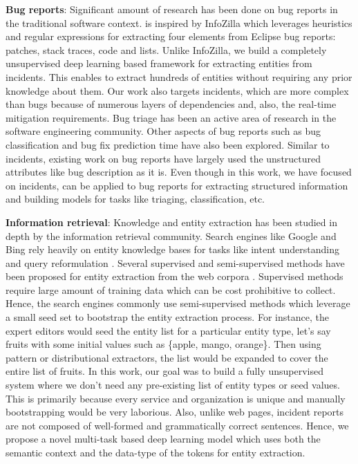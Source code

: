 \textbf{Bug reports}: Significant amount of research has been done on bug reports in the traditional software context. \softner{} is inspired by InfoZilla \cite{bettenburg2008extracting} which leverages heuristics and regular expressions for extracting four elements from Eclipse bug reports: patches, stack traces, code and lists. Unlike InfoZilla, we build a completely unsupervised deep learning based framework for extracting entities from incidents. This enables \softner{} to extract hundreds of entities without requiring any prior knowledge about them. Our work also targets incidents, which are more complex than bugs because of numerous layers of dependencies and, also, the real-time mitigation requirements. Bug triage has been an active area of research \cite{anvik2006should, tian2016learning, bortis2013porchlight, wang2014fixercache} in the software engineering community. Other aspects of bug reports such as bug classification \cite{zhou2016combining} and bug fix prediction time \cite{ardimento2017knowledge} have also been explored. Similar to incidents, existing work on bug reports have largely used the unstructured attributes like bug description as it is. Even though in this work, we have focused on incidents, \softner{} can be applied to bug reports for extracting structured information and building models for tasks like triaging, classification, etc.

\textbf{Information retrieval}: Knowledge and entity extraction has been studied in depth by the information retrieval community. Search engines like Google and Bing rely heavily on entity knowledge bases for tasks like intent understanding \cite{pantel2012mining} and query reformulation \cite{xu2008entity}. Several supervised and semi-supervised methods have been proposed for entity extraction from the web corpora \cite{florian2003named, mccallum2003early, pacsca2007weakly, vyas2009semi}. Supervised methods require large amount of training data which can be cost prohibitive to collect. Hence, the search engines commonly use semi-supervised methods which leverage a small seed set to bootstrap the entity extraction process. For instance, the expert editors would seed the entity list for a particular entity type, let's say fruits with some initial values such as \{apple, mango, orange\}. Then using pattern or distributional extractors, the list would be expanded to cover the entire list of fruits. In this work, our goal was to build a fully unsupervised system where we don't need any pre-existing list of entity types or seed values. This is primarily because every service and organization is unique and manually bootstrapping \softner{} would be very laborious. Also, unlike web pages, incident reports are not composed of well-formed and grammatically correct sentences. Hence, we propose a novel multi-task based deep learning model which uses both the semantic context and the data-type of the tokens for entity extraction.